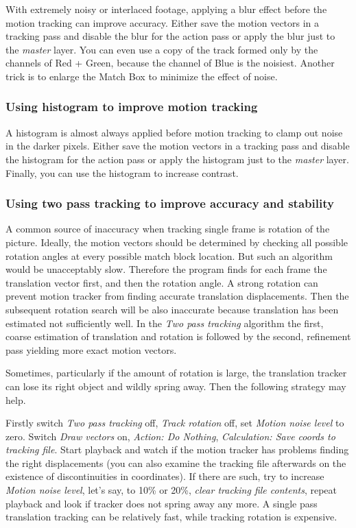 With extremely noisy or interlaced footage, applying a blur effect before the motion tracking can improve accuracy. Either save the motion vectors in a tracking pass and disable the blur for the action pass or apply the blur just to the \textit{master} layer. You can even use a copy of the track formed only by the channels of Red + Green, because the channel of Blue is the noisiest. Another trick is to enlarge the Match Box to minimize the effect of noise.

\subsubsection*{Using histogram to improve motion tracking}
\label{ssub:histogram_improve_motion_tracking}

A histogram is almost always applied before motion tracking to clamp out noise in the darker pixels. Either save the motion vectors in a tracking pass and disable the histogram for the action pass or apply the histogram just to the \textit{master} layer. Finally, you can use the histogram to increase contrast.

\subsubsection*{Using two pass tracking to improve accuracy and stability}
\label{ssub:two_pass_improve_accuracy}

A common source of inaccuracy when tracking single frame is rotation of the
picture.  Ideally, the motion vectors should be determined by checking all
possible rotation angles at every possible match block location.  But such
an algorithm would be unacceptably slow.  Therefore the program finds for
each frame the translation vector first, and then the rotation angle.  A
strong rotation can prevent motion tracker from finding accurate translation
displacements.  Then the subsequent rotation search will be also inaccurate
because translation has been estimated not sufficiently well.  In the \textit{Two
pass tracking} algorithm the first, coarse estimation of translation and
rotation is followed by the second, refinement pass yielding more exact
motion vectors.

Sometimes, particularly if the amount of rotation is large, the translation
tracker can lose its right object and wildly spring away.  Then the
following strategy may help.

Firstly switch \textit{Two pass tracking} off, \textit{Track rotation} off, set \textit{Motion noise level} to zero.  Switch \textit{Draw vectors} on, \textit{Action: Do Nothing}, \textit{Calculation: Save coords to tracking file}.  Start playback and watch if the motion tracker has problems finding the right displacements (you can also examine the tracking file afterwards on the existence of discontinuities in coordinates).  If there are such, try to increase \textit{Motion noise level}, let's say, to 10\% or 20\%, \textit{clear tracking file contents}, repeat playback and look if tracker does not spring away any more.  A single pass translation tracking can be relatively fast, while tracking rotation is expensive.

